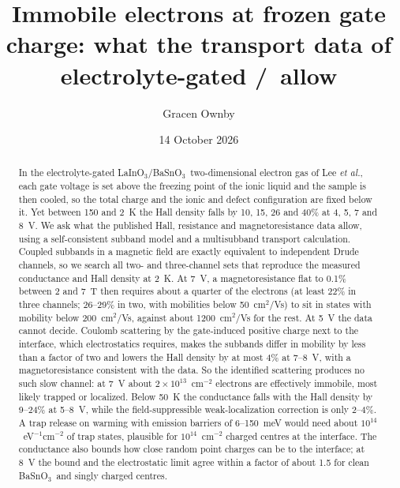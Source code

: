 \documentclass[11pt]{article}
\title{Immobile electrons at frozen gate charge: what the transport data of electrolyte-gated \LIO/\BSO\ allow}
\author{Gracen Ownby}
\affil{University of Oklahoma, Norman, Oklahoma, USA}
\date{\small 14 October 2026}
\newcommand{\LIO}{\texorpdfstring{LaInO$_3$}{LaInO3}}
\newcommand{\BSO}{\texorpdfstring{BaSnO$_3$}{BaSnO3}}
\begin{document}
\maketitle

\begin{abstract}
In the electrolyte-gated \LIO/\BSO\ two-dimensional electron gas of Lee \emph{et al.}, each gate voltage is set above the freezing point of the ionic liquid and the sample is then cooled, so the total charge and the ionic and defect configuration are fixed below it. Yet between 150 and 2~K the Hall density falls by 10, 15, 26 and 40\% at 4, 5, 7 and 8~V. We ask what the published Hall, resistance and magnetoresistance data allow, using a self-consistent subband model and a multisubband transport calculation. Coupled subbands in a magnetic field are exactly equivalent to independent Drude channels, so we search all two- and three-channel sets that reproduce the measured conductance and Hall density at 2~K. At 7~V, a magnetoresistance flat to 0.1\% between 2 and 7~T then requires about a quarter of the electrons (at least 22\% in three channels; 26--29\% in two, with mobilities below 50~cm$^2$/Vs) to sit in states with mobility below 200~cm$^2$/Vs, against about 1200~cm$^2$/Vs for the rest. At 5~V the data cannot decide. Coulomb scattering by the gate-induced positive charge next to the interface, which electrostatics requires, makes the subbands differ in mobility by less than a factor of two and lowers the Hall density by at most 4\% at 7--8~V, with a magnetoresistance consistent with the data. So the identified scattering produces no such slow channel: at 7~V about $2\times10^{13}$~cm$^{-2}$ electrons are effectively immobile, most likely trapped or localized. Below 50~K the conductance falls with the Hall density by 9--24\% at 5--8~V, while the field-suppressible weak-localization correction is only 2--4\%. A trap release on warming with emission barriers of 6--150~meV would need about $10^{14}$~eV$^{-1}$cm$^{-2}$ of trap states, plausible for $10^{14}$~cm$^{-2}$ charged centres at the interface. The conductance also bounds how close random point charges can be to the interface; at 8~V the bound and the electrostatic limit agree within a factor of about 1.5 for clean \BSO\ and singly charged centres.
\end{abstract}
\end{document}
